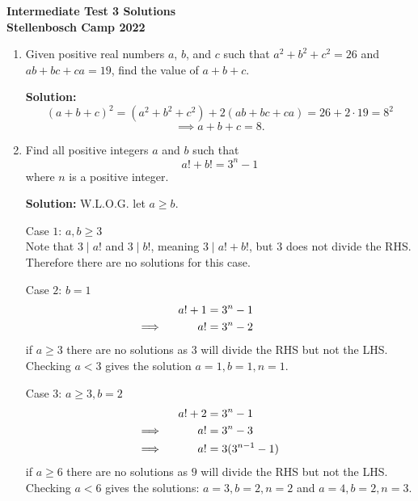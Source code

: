 \documentclass{article}
\begin{document}
\thispagestyle{empty}

\begin{center} \bfseries
  \Large Intermediate Test 3 Solutions
  \\ \vspace{12pt}
  \large Stellenbosch Camp 2022
\end{center}

\bigskip \bigskip

\begin{enumerate}[itemsep=24pt]

\item %
Given positive real numbers $a$, $b$, and $c$ such that $a^2+b^2+c^2 = 26$ and $ab+bc+ca = 19$, find the value of $a+b+c$.

\textbf{Solution:} 
\[(a+b+c)^2 = (a^2+b^2+c^2) + 2(ab + bc + ca) = 26 + 2\cdot 19 = 8^2\]
\[\implies a+b+c = 8.\]

\item
Find all positive integers $a$ and $b$ such that 
$$a! + b! = 3^n -1 $$
where $n$ is a positive integer.

\textbf{Solution:} 
W.L.O.G. let $a\geq b$.

Case $1$: $a,b\geq3$\\
Note that $3 \mid a!$ and $3 \mid b!$, meaning $3 \mid a!+b!$, but $3$ does not divide the RHS.
Therefore there are no solutions for this case.

Case $2$: $b=1$
\begin{align*}
    a!+1&=3^n-1\\
    \implies \hspace{10mm} a!&=3^n-2 \hspace{15mm}
\end{align*}
if $a\geq3$ there are no solutions as $3$ will divide the RHS but not the LHS. Checking $a<3$ gives the solution $a=1, b=1, n=1$.

Case $3$: $a\geq3, b=2$
\begin{align*}
    a!+2&=3^n-1\\
    \implies \hspace{10mm} a!&=3^n-3 \hspace{10mm} \\
    \implies \hspace{10mm} a!&=3(3^{n-1}-1) \hspace{7mm}
\end{align*}
if $a\geq6$ there are no solutions as $9$ will divide the RHS but not the LHS. Checking $a<6$ gives the solutions: $a=3, b=2, n=2$ and $a=4, b=2, n=3$.


\end{enumerate}
\end{document}
